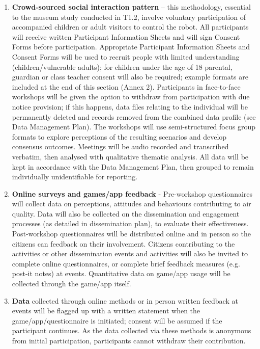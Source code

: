 \documentclass[11pt,a4paper]{report}
\begin{document}
\begin{enumerate}
    \item {\bf Crowd-sourced social interaction pattern} -- this methodology,
        essential to the museum study conducted in T1.2, involve voluntary
        participation of accompanied children or adult visitors to control the robot.
        All participants will receive written Participant Information Sheets and will
sign Consent Forms before participation. Appropriate Participant Information Sheets and
Consent Forms will be used to recruit people with limited understanding
(children/vulnerable adults); for children under the age of 18 parental, guardian or class
teacher consent will also be required; example formats are included at the end of this
section (Annex 2). Participants in face-to-face workshops will be given the option to
withdraw from participation with due notice provision; if this happens, data files relating to
the individual will be permanently deleted and records removed from the combined data
profile (see Data Management Plan). The workshops will use semi-structured focus group
formats to explore perceptions of the resulting scenarios and develop consensus outcomes.
Meetings will be audio recorded and transcribed verbatim, then analysed with qualitative
thematic analysis. All data will be kept in accordance with the Data Management Plan, then
grouped to remain individually unidentifiable for reporting.

\item {\bf Online surveys and games/app feedback} - Pre-workshop questionnaires will collect data on
perceptions, attitudes and behaviours contributing to air quality. Data will also be collected
on the dissemination and engagement processes (as detailed in dissemination plan), to
evaluate their effectiveness. Post-workshop questionnaires will be distributed online and in
person so the citizens can feedback on their involvement. Citizens contributing to the
activities or other dissemination events and activities will also be invited to complete online
questionnaires, or complete brief feedback measures (e.g. post-it notes) at events.
Quantitative data on game/app usage will be collected through the game/app itself.

\item{\bf Data} collected through online methods or in person written feedback at events will be
flagged up with a written statement when the game/app/questionnaire is initiated; consent
will be assumed if the participant continues. As the data collected via these methods is
anonymous from initial participation, participants cannot withdraw their
contribution.
\end{enumerate}
\end{document}
